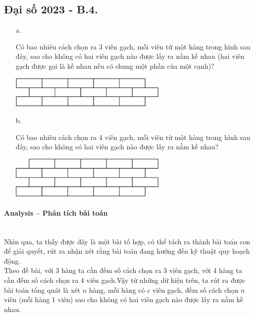 \documentclass{article}
\begin{document}
\subsection{Đại số 2023 - B.4.}
    \begin{enumerate}
        \item[a.] {Có bao nhiêu cách chọn ra 3 viên gạch, mỗi viên từ một hàng trong hình sau đây, sao cho không có hai viên gạch nào được lấy ra nằm kề nhau (hai viên gạch được gọi là kề nhau nếu có chung một phần của một cạnh)?
        
        \begin{center}
            \includegraphics[width=0.6\textwidth]{Figures/01.png}
        \end{center}}
        \item[b.] {Có bao nhiêu cách chọn ra 4 viên gạch, mỗi viên từ một hàng trong hình sau đây, sao cho không có hai viên gạch nào được lấy ra nằm kề nhau?
        
        \begin{center}
            \includegraphics[width=0.6\textwidth]{Figures/02.png}
        \end{center}}
    \end{enumerate}

\paragraph{Analysis -- Phân tích bài toán} \mbox{} \\

Nhìn qua, ta thấy được đây là một bài tổ hợp, có thể tách ra thành bài toán con để giải quyết, rút ra nhận xét rằng bài toán đang hướng đến kỹ thuật quy hoạch động. \\

Theo đề bài, với 3 hàng ta cần đếm số cách chọn ra 3 viên gạch, với 4 hàng ta cần đếm số cách chọn ra 4 viên gạch.Vậy từ những dữ kiện trên, ta rút ra được bài toán tổng quát là xét $n$ hàng, mỗi hàng có $c$ viên gạch, đếm số cách chọn $n$ viên (mỗi hàng 1 viên) sao cho không có hai viên gạch nào được lấy ra nằm kề nhau. \\
\end{document}
